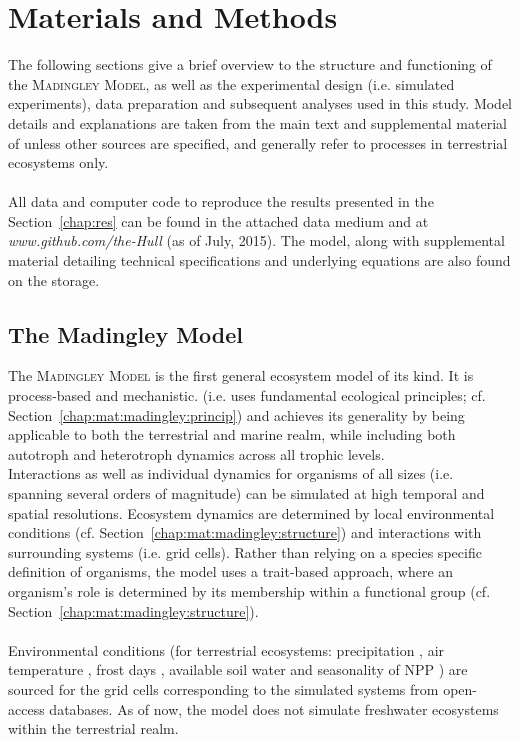 \chapter{Materials and Methods}
\label{chap:mat}
The following sections give a brief overview to the    structure and functioning of the \textsc{Madingley Model}, as well as the experimental design (i.e. simulated experiments), data preparation and subsequent analyses used in this study. Model details and explanations are taken from the main text and supplemental material of \cite{Harfoot2014} unless other sources are specified, and generally refer to processes in terrestrial ecosystems only.\\\\
 All data and computer code to reproduce the results presented in the Section~\ref{chap:res} can be found in the attached data medium and at \textit{www.github.com/the-Hull} (as of July, 2015). The model, along with supplemental material detailing technical specifications and underlying equations are also found on the storage.
\section{The Madingley Model}
\label{chap:mat:madingley}
%
The \textsc{Madingley Model} is the first general ecosystem model of its kind. 
It is process-based  and mechanistic. (i.e. uses fundamental ecological principles; cf. Section~\ref{chap:mat:madingley:princip}) and achieves its generality by being applicable to both the terrestrial and marine realm, while including both autotroph and heterotroph dynamics across all trophic levels. \\
Interactions as well as individual  dynamics for organisms of all sizes (i.e. spanning several orders of magnitude) can be simulated at high temporal and spatial resolutions. 
Ecosystem dynamics are determined by local environmental conditions (cf. Section~\ref{chap:mat:madingley:structure}) and interactions with surrounding systems (i.e. grid cells). 
Rather than relying on a species specific definition of organisms, the model uses a trait-based approach, where an organism's role is determined by its membership within a functional group (cf. Section~\ref{chap:mat:madingley:structure}).
\\\\
Environmental conditions (for terrestrial ecosystems: precipitation
, air temperature , frost days , available soil water   and seasonality of NPP ) are sourced for the grid cells corresponding to the simulated systems  from open-access databases. As of now, the model does not simulate freshwater ecosystems within the terrestrial realm.
